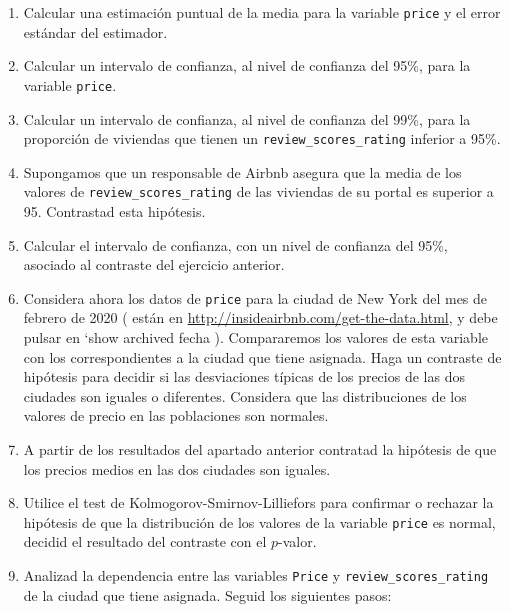 \documentclass[
]{article}
\begin{document}
\begin{enumerate}
\def\labelenumi{\arabic{enumi}.}
\item
  Calcular una estimación puntual de la media para la variable
  \texttt{price} y el error estándar del estimador.
\item
  Calcular un intervalo de confianza, al nivel de confianza del 95\%,
  para la variable \texttt{price}.
\item
  Calcular un intervalo de confianza, al nivel de confianza del 99\%,
  para la proporción de viviendas que tienen un
  \texttt{review\_scores\_rating} inferior a 95\%.
\item
  Supongamos que un responsable de Airbnb asegura que la media de los
  valores de \texttt{review\_scores\_rating} de las viviendas de su
  portal es superior a 95. Contrastad esta hipótesis.
\item
  Calcular el intervalo de confianza, con un nivel de confianza del
  95\%, asociado al contraste del ejercicio anterior.
\item
  Considera ahora los datos de \texttt{price} para la ciudad de New York
  del mes de febrero de 2020 ( están en
  \url{http://insideairbnb.com/get-the-data.html}, y debe pulsar en
  `show archived fecha ). Compararemos los valores de esta variable con
  los correspondientes a la ciudad que tiene asignada. Haga un contraste
  de hipótesis para decidir si las desviaciones típicas de los precios
  de las dos ciudades son iguales o diferentes. Considera que las
  distribuciones de los valores de precio en las poblaciones son
  normales.
\item
  A partir de los resultados del apartado anterior contratad la
  hipótesis de que los precios medios en las dos ciudades son iguales.
\item
  Utilice el test de Kolmogorov-Smirnov-Lilliefors para confirmar o
  rechazar la hipótesis de que la distribución de los valores de la
  variable \texttt{price} es normal, decidid el resultado del contraste
  con el \(p\)-valor.
\item
  Analizad la dependencia entre las variables \texttt{Price} y
  \texttt{review\_scores\_rating} de la ciudad que tiene asignada.
  Seguid los siguientes pasos:


\end{enumerate}
\end{document}
